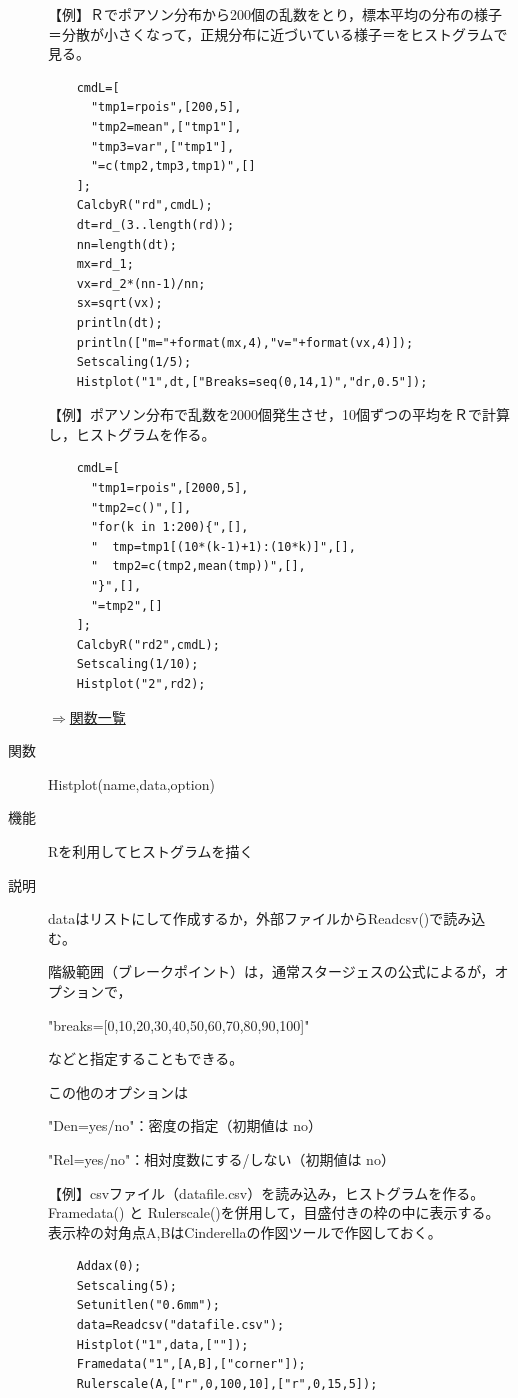 \documentclass[papersize,a4paper,12pt,uplatex]{jsarticle}
\begin{document}
\begin{description}
\vspace{\baselineskip}
【例】Ｒでポアソン分布から200個の乱数をとり，標本平均の分布の様子＝分散が小さくなって，正規分布に近づいている様子＝をヒストグラムで見る。
\begin{verbatim}
    cmdL=[
      "tmp1=rpois",[200,5],
      "tmp2=mean",["tmp1"],
      "tmp3=var",["tmp1"],
      "=c(tmp2,tmp3,tmp1)",[]
    ];
    CalcbyR("rd",cmdL);
    dt=rd_(3..length(rd));
    nn=length(dt);
    mx=rd_1;
    vx=rd_2*(nn-1)/nn;
    sx=sqrt(vx);
    println(dt);
    println(["m="+format(mx,4),"v="+format(vx,4)]);
    Setscaling(1/5);
    Histplot("1",dt,["Breaks=seq(0,14,1)","dr,0.5"]);
\end{verbatim}
\vspace{\baselineskip}
          \begin{center}  \end{center}
\vspace{\baselineskip}
【例】ポアソン分布で乱数を2000個発生させ，10個ずつの平均をＲで計算し，ヒストグラムを作る。
\begin{verbatim}
    cmdL=[
      "tmp1=rpois",[2000,5],
      "tmp2=c()",[],
      "for(k in 1:200){",[],
      "  tmp=tmp1[(10*(k-1)+1):(10*k)]",[],
      "  tmp2=c(tmp2,mean(tmp))",[],
      "}",[],
      "=tmp2",[]
    ];
    CalcbyR("rd2",cmdL);
    Setscaling(1/10);
    Histplot("2",rd2);
\end{verbatim}

\begin{flushright}  \hyperlink{functionlist}{$\Rightarrow$関数一覧}\end{flushright}
\hypertarget{histplot}{}
\item[関数]  Histplot(name,data,option)
\item[機能]  Rを利用してヒストグラムを描く
\item[説明]  dataはリストにして作成するか，外部ファイルからReadcsv()で読み込む。

階級範囲（ブレークポイント）は，通常スタージェスの公式によるが，オプションで，

      "breaks=[0,10,20,30,40,50,60,70,80,90,100]"
      
などと指定することもできる。

  この他のオプションは
  
    "Den=yes/no"：密度の指定（初期値は no）
    
    "Rel=yes/no"：相対度数にする/しない（初期値は no）
    
\vspace{\baselineskip}
【例】csvファイル（datafile.csv）を読み込み，ヒストグラムを作る。Framedata() と Rulerscale()を併用して，目盛付きの枠の中に表示する。表示枠の対角点A,BはCinderellaの作図ツールで作図しておく。
\begin{verbatim}
    Addax(0);
    Setscaling(5);
    Setunitlen("0.6mm");
    data=Readcsv("datafile.csv");
    Histplot("1",data,[""]);
    Framedata("1",[A,B],["corner"]);
    Rulerscale(A,["r",0,100,10],["r",0,15,5]);
\end{verbatim}
    \begin{center}  \end{center}


\end{description}
\end{document}
